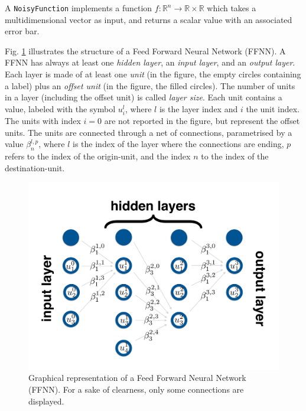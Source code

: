 \documentclass[11pt,a4paper,twoside]{article}
\begin{document}
A \verb+NoisyFunction+ implements a function $f:\mathbb{R}^{n} \rightarrow \mathbb{R} \times \mathbb{R}$ which takes a multidimensional vector as input, and returns a scalar value with an associated error bar.

Fig. \ref{fig:FFNN} illustrates the structure of a Feed Forward Neural Network (FFNN).
A FFNN has always at least one \emph{hidden layer}, an \emph{input layer}, and an \emph{output layer}.
Each layer is made of at least one \emph{unit} (in the figure, the empty circles containing a label) plus an \emph{offset unit} (in the figure, the filled circles).
The number of units in a layer (including the offset unit) is called \emph{layer size}.
Each unit contains a value, labeled with the symbol $u^l_i$, where $l$ is the layer index and $i$ the unit index.
The units with index $i=0$ are not reported in the figure, but represent the offset units.
The units are connected through a net of connections, parametrised by a value $\beta^{l,p}_n$, where $l$ is the index of the layer where the connections are ending, $p$ refers to the index of the origin-unit, and the index $n$ to the index of the destination-unit.

\begin{figure}[htpb]
  \centering
  \includegraphics[width=.9\textwidth]{FFNN.pdf}
  \caption{Graphical representation of a Feed Forward Neural Network (FFNN). For a sake of clearness, only some connections are displayed.}
  \label{fig:FFNN}
\end{figure}
\end{document}
